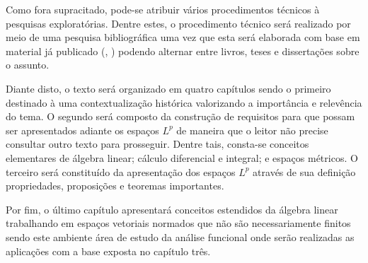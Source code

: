  Como fora supracitado, pode-se atribuir vários procedimentos técnicos à pesquisas exploratórias. Dentre estes, o procedimento técnico será realizado por meio de uma pesquisa bibliográfica uma vez que esta será elaborada com base em material já publicado (\citeauthor{gil}, \citeyear{gil}) podendo alternar entre livros, teses e dissertações sobre o assunto.

 Diante disto, o texto será organizado em quatro capítulos sendo o primeiro destinado à uma contextualização histórica valorizando a importância e relevência do tema. 
 O segundo será composto da construção de requisitos para que possam ser apresentados adiante os espaços $L^p$ de maneira que o leitor não precise consultar outro texto para prosseguir. 
 Dentre tais, consta-se conceitos elementares de álgebra linear; cálculo diferencial e integral; e espaços métricos.
 O terceiro será constituído da apresentação dos espaços $L^p$ através de sua definição propriedades, proposições e teoremas importantes.

 Por fim, o último capítulo apresentará conceitos estendidos da álgebra linear trabalhando em espaços vetoriais normados que não são necessariamente finitos sendo este ambiente área de estudo da análise funcional onde serão realizadas as aplicações com a base exposta no capítulo três.